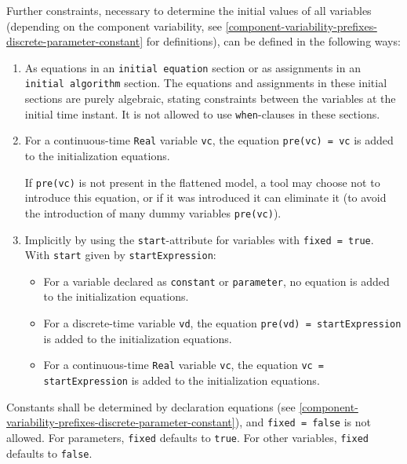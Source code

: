 Further constraints, necessary to determine the initial values of all variables (depending on the component variability, see \cref{component-variability-prefixes-discrete-parameter-constant} for definitions), can be defined in the following ways:
\begin{enumerate}
\item
  As equations in an \lstinline!initial equation! section or as assignments in an \lstinline!initial algorithm! section.
  The equations and assignments in these initial sections are purely algebraic, stating constraints between the variables at the initial time instant.
  It is not allowed to use \lstinline!when!-clauses in these sections.
\item
  For a continuous-time \lstinline!Real! variable \lstinline!vc!, the equation \lstinline!pre(vc) = vc! is added to the initialization equations.
  \begin{nonnormative}
  If \lstinline!pre(vc)! is not present in the flattened model, a tool may choose not to introduce this equation, or if it was introduced
  it can eliminate it (to avoid the introduction of many dummy variables \lstinline!pre(vc)!).
  \end{nonnormative}
\item
  Implicitly by using the \lstinline!start!-attribute for variables with \lstinline!fixed = true!.
  With \lstinline!start! given by \lstinline!startExpression!:
  \begin{itemize}
  \item
    For a variable declared as \lstinline!constant! or \lstinline!parameter!, no equation is added to the initialization equations.
  \item
    For a discrete-time variable \lstinline!vd!, the equation \lstinline!pre(vd) = startExpression! is added to the initialization equations.
  \item
    For a continuous-time \lstinline!Real! variable \lstinline!vc!, the equation \lstinline!vc = startExpression! is added to the initialization equations.
  \end{itemize}
\end{enumerate}

Constants shall be determined by declaration equations (see \cref{component-variability-prefixes-discrete-parameter-constant}), and \lstinline!fixed = false! is not allowed.
For parameters, \lstinline!fixed! defaults to \lstinline!true!.
For other variables, \lstinline!fixed! defaults to \lstinline!false!.

